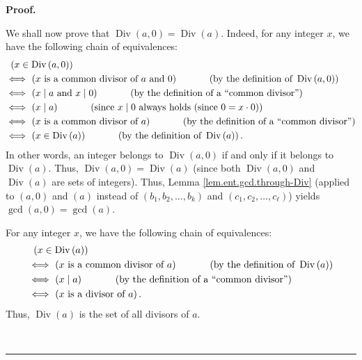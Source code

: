 \documentclass[numbers=enddot,12pt,final,onecolumn,notitlepage]{scrartcl}%
\numberwithin{exer}{subsection}
\theoremstyle{definition}
\newenvironment{fineprint}{\begin{small}}{\end{small}}
\newenvironment{proof}[1][Proof]{\noindent\textbf{#1.} }{\ \rule{0.5em}{0.5em}}
\begin{document}
\begin{proof}
\begin{fineprint}
We shall now prove that $\operatorname*{Div}\left(  a,0\right)
=\operatorname*{Div}\left(  a\right)  $. Indeed, for any integer $x$, we have
the following chain of equivalences:%
\begin{align*}
&  \ \left(  x\in\operatorname*{Div}\left(  a,0\right)  \right) \\
&  \Longleftrightarrow\ \left(  x\text{ is a common divisor of }a\text{ and
}0\right)  \ \ \ \ \ \ \ \ \ \ \left(  \text{by the definition of
}\operatorname*{Div}\left(  a,0\right)  \right) \\
&  \Longleftrightarrow\ \left(  x\mid a\text{ and }x\mid0\right)
\ \ \ \ \ \ \ \ \ \ \left(  \text{by the definition of a \textquotedblleft
common divisor\textquotedblright}\right) \\
&  \Longleftrightarrow\ \left(  x\mid a\right)  \ \ \ \ \ \ \ \ \ \ \left(
\text{since }x\mid0\text{ always holds (since }0=x\cdot0\text{)}\right) \\
&  \Longleftrightarrow\ \left(  x\text{ is a common divisor of }a\right)
\ \ \ \ \ \ \ \ \ \ \left(  \text{by the definition of a \textquotedblleft
common divisor\textquotedblright}\right) \\
&  \Longleftrightarrow\ \left(  x\in\operatorname*{Div}\left(  a\right)
\right)  \ \ \ \ \ \ \ \ \ \ \left(  \text{by the definition of }%
\operatorname*{Div}\left(  a\right)  \right)  .
\end{align*}
In other words, an integer belongs to $\operatorname*{Div}\left(  a,0\right)
$ if and only if it belongs to $\operatorname*{Div}\left(  a\right)  $. Thus,
$\operatorname*{Div}\left(  a,0\right)  =\operatorname*{Div}\left(  a\right)
$ (since both $\operatorname*{Div}\left(  a,0\right)  $ and
$\operatorname*{Div}\left(  a\right)  $ are sets of integers). Thus, Lemma
\ref{lem.ent.gcd.through-Div} (applied to $\left(  a,0\right)  $ and $\left(
a\right)  $ instead of $\left(  b_{1},b_{2},\ldots,b_{k}\right)  $ and
$\left(  c_{1},c_{2},\ldots,c_{\ell}\right)  $) yields $\gcd\left(
a,0\right)  =\gcd\left(  a\right)  $.

For any integer $x$, we have the following chain of equivalences:
\begin{align*}
&  \ \left(  x\in\operatorname*{Div}\left(  a\right)  \right) \\
&  \Longleftrightarrow\ \left(  x\text{ is a common divisor of }a\right)
\ \ \ \ \ \ \ \ \ \ \left(  \text{by the definition of }\operatorname*{Div}%
\left(  a\right)  \right) \\
&  \Longleftrightarrow\ \left(  x\mid a\right)  \ \ \ \ \ \ \ \ \ \ \left(
\text{by the definition of a \textquotedblleft common
divisor\textquotedblright}\right) \\
&  \Longleftrightarrow\ \left(  x\text{ is a divisor of }a\right)  .
\end{align*}
Thus, $\operatorname*{Div}\left(  a\right)  $ is the set of all divisors of
$a$.


\end{fineprint}
\end{proof}
\end{document}
